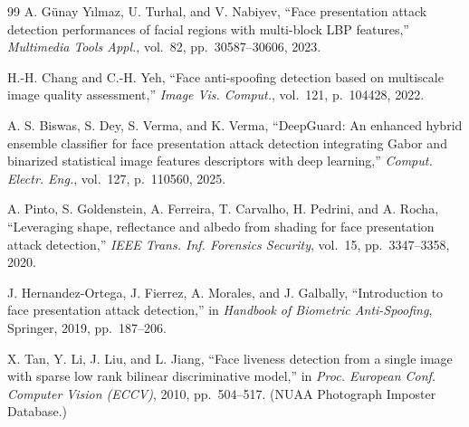 \documentclass[11pt]{article}
\begin{document}
\begin{thebibliography}{99}
 A. G\"unay Y\i lmaz, U. Turhal, and V. Nabiyev, ``Face presentation attack detection performances of facial regions with multi-block LBP features,'' \emph{Multimedia Tools Appl.}, vol.\ 82, pp.\ 30587--30606, 2023.

 H.-H. Chang and C.-H. Yeh, ``Face anti-spoofing detection based on multiscale image quality assessment,'' \emph{Image Vis. Comput.}, vol.\ 121, p.\ 104428, 2022.

 A. S. Biswas, S. Dey, S. Verma, and K. Verma, ``DeepGuard: An enhanced hybrid ensemble classifier for face presentation attack detection integrating Gabor and binarized statistical image features descriptors with deep learning,'' \emph{Comput. Electr. Eng.}, vol.\ 127, p.\ 110560, 2025.

 A. Pinto, S. Goldenstein, A. Ferreira, T. Carvalho, H. Pedrini, and A. Rocha, ``Leveraging shape, reflectance and albedo from shading for face presentation attack detection,'' \emph{IEEE Trans. Inf. Forensics Security}, vol.\ 15, pp.\ 3347--3358, 2020.

 J. Hernandez-Ortega, J. Fierrez, A. Morales, and J. Galbally, ``Introduction to face presentation attack detection,'' in \emph{Handbook of Biometric Anti-Spoofing}, Springer, 2019, pp.\ 187--206.

 X. Tan, Y. Li, J. Liu, and L. Jiang, ``Face liveness detection from a single image with sparse low rank bilinear discriminative model,'' in \emph{Proc. European Conf. Computer Vision (ECCV)}, 2010, pp.\ 504--517. (NUAA Photograph Imposter Database.)

\end{thebibliography}
\end{document}
